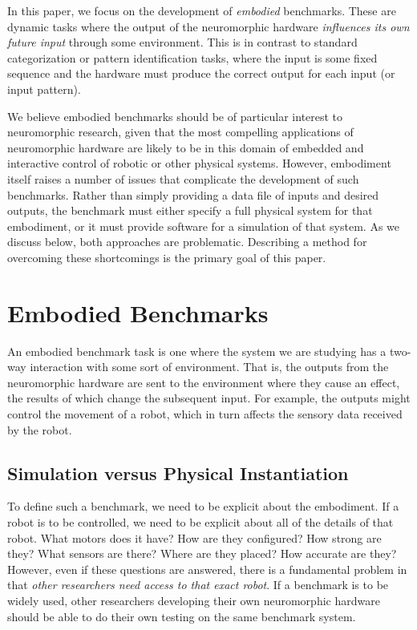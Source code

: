 \documentclass{frontiersSCNS} %
\begin{document}
In this paper, we focus on the development of \emph{embodied} benchmarks.
These are dynamic tasks where the output of the neuromorphic hardware \emph{influences
its own future input} through some environment.  This is in contrast to standard categorization or pattern
identification tasks, where the input is some fixed sequence and the hardware
must produce the correct output for each input (or input pattern).

We believe embodied benchmarks should be of particular interest to
neuromorphic research, given that the most compelling applications of neuromorphic
hardware are likely to be in this domain of embedded and interactive control
of robotic or other physical systems.  However, embodiment itself raises a number
of issues that complicate the development of such benchmarks.  Rather than
simply providing a data file of inputs and desired outputs, the benchmark
must either specify a full physical system for that embodiment, or it must 
provide software for a simulation of that system.  As we discuss below, both
approaches are problematic.  
Describing a method for overcoming these shortcomings is the primary goal of
this paper.


\section{Embodied Benchmarks}

An embodied benchmark task is one where the system we are studying has a 
two-way interaction with some sort of environment.  That is, the outputs from
the neuromorphic hardware are sent to the environment where they cause
an effect, the results of which change the subsequent input.  For example,
the outputs might control the movement of a robot, which in turn affects the
sensory data received by the robot.

\subsection{Simulation versus Physical Instantiation}

To define such a benchmark, we need to be explicit about the embodiment.  If
a robot is to be controlled, we need to be explicit
about all of the details of that robot.  What motors does it have?  How are they
configured?  How strong are they?  What sensors are there?  Where are they
placed?  How accurate are they?  However, even if these questions are
answered, there is a fundamental problem in that \emph{other researchers
need access to that exact robot}.  If a benchmark is to be widely used, other
researchers developing their own neuromorphic hardware should be able to do their own 
testing on the same benchmark system.
\end{document}
